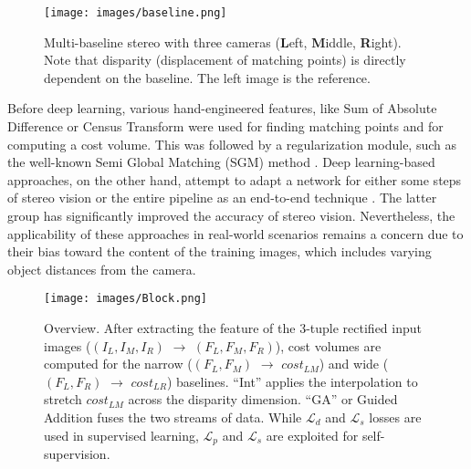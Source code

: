 \documentclass[10pt,twocolumn,letterpaper]{article}
\begin{document}
\begin{figure}[t]
	\begin{center}
		\texttt{[image: images/baseline.png]}
	\end{center}
	\vspace{-0.6cm}
	\caption{Multi-baseline stereo with three cameras (\textbf{L}eft, \textbf{M}iddle, \textbf{R}ight). Note that disparity (displacement of matching points) is directly dependent on the baseline. The left image is the reference.}
	\label{fig:baseline}
\end{figure} Before deep learning, various hand-engineered features, like Sum of Absolute Difference or Census Transform \cite{zabih1994non} were used for finding matching points and for computing a cost volume. This was followed by a regularization module, such as the well-known Semi Global Matching (SGM) method \cite{hirschmuller2005accurate}. Deep learning-based approaches, on the other hand, attempt to adapt a network for either some steps of stereo vision \cite{vzbontar2016stereo,seki2017sgm} or the entire pipeline as an end-to-end technique \cite{kendall2017end,chang2018pyramid,guo2019group,zhang2019ga}. The latter group has significantly improved the accuracy of stereo vision. 
Nevertheless, the applicability of these approaches in real-world scenarios remains a concern due to their bias toward the content of the training images, which includes varying object distances from the camera.
\begin{figure*}[t]
	\begin{center}
		\texttt{[image: images/Block.png]}
	\end{center}
	\vspace{-0.5cm}
	\caption{Overview. After extracting the feature of the 3-tuple rectified input images ($(I_L,I_M,I_R)$ $\rightarrow$ $(F_L,F_M,F_R)$), cost volumes are computed for the narrow ($(F_L,F_M)$ $\rightarrow$ $cost_{LM}$) and wide ($(F_L,F_R)$ $\rightarrow$ $cost_{LR}$) baselines. \enquote{Int} applies the interpolation to stretch  $cost_{LM}$ across the disparity dimension. \enquote{GA} or Guided Addition fuses the two streams of data. While $\mathcal{L}_{d}$ and $\mathcal{L}_{s}$ losses are used in supervised learning, $\mathcal{L}_{p}$ and $\mathcal{L}_{s}$ are exploited for self-supervision.}
	\label{fig:generalframework}
\end{figure*} 
\end{document}
